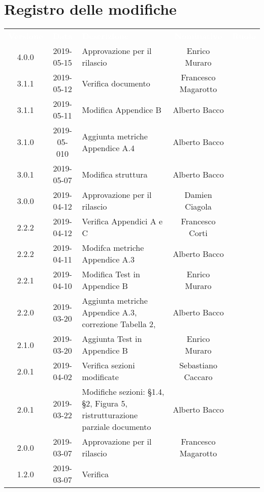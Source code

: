 \section{Registro delle modifiche}
{
	\renewcommand{\arraystretch}{1.5}
	\centering
	\begin{longtable}{c c C{4cm} c  c }
		\textcolor{white}{\textbf{Versione}} &
		\textcolor{white}{\textbf{Data}} &
		\textcolor{white}{\textbf{Descrizione}} &
		\textcolor{white}{\textbf{Nominativo}} &
		\textcolor{white}{\textbf{Ruolo}} \\
		
		4.0.0 &
		2019-05-15 &
		Approvazione per il rilascio &
		Enrico Muraro &
		\Res{}
		\\
		3.1.1 &
		2019-05-12 &
		Verifica documento &
		Francesco Magarotto &
		\ver{}
		\\
		3.1.1 &
		2019-05-11 &
		Modifica Appendice B &
		Alberto Bacco &
		\reda{}
		\\
		3.1.0 &
		2019-05-010 &
		Aggiunta metriche Appendice A.4 &
		Alberto Bacco &
		\reda{}
		\\
		3.0.1 &
		2019-05-07 &
		Modifica struttura &
		Alberto Bacco &
		\reda{}
		\\
		3.0.0 &
		2019-04-12 &
		Approvazione per il rilascio &
		Damien Ciagola &
		\Res{}
		\\
		2.2.2 &
		2019-04-12 &
		Verifica Appendici A e C &
		Francesco Corti &
		\ver{}	
		\\
		2.2.2 &
		2019-04-11 &
		Modifca metriche Appendice A.3 &
		Alberto Bacco &
		\reda{}	
		\\
		2.2.1 &
		2019-04-10 &
		Modifica Test in Appendice B &
		Enrico Muraro &
		\reda{}	
		\\
		2.2.0 &
		2019-03-20 &
		Aggiunta metriche Appendice A.3, correzione Tabella 2, &
		Alberto Bacco &
		\reda{}	
		\\
		2.1.0 &
		2019-03-20 &
		Aggiunta Test in Appendice B &
		Enrico Muraro &
		\reda{}	
		\\
		2.0.1 &
		2019-04-02 &
		Verifica sezioni modificate &
		Sebastiano Caccaro &
		\ver{}	
		\\
		2.0.1 &
		2019-03-22 &
		Modifiche sezioni: §1.4, §2, Figura 5, ristrutturazione parziale documento &
		Alberto Bacco &
		\reda{}	
		\\
		2.0.0 &
		2019-03-07 &
		Approvazione per il rilascio &
		Francesco Magarotto &
		\Res{}
		\\		
		1.2.0 &
		2019-03-07 &
		Verifica &

\end{longtable}}
